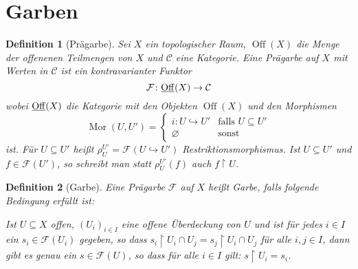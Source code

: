 \documentclass[a4paper,oneside]{scrbook}
\theoremstyle{break}
\newtheorem{Def}{Definition}[section]
\theoremstyle{nonumberbreak}
\theoremstyle{nonumberplain}
\theoremstyle{break}
\newcommand{\Mor}{%
	\ensuremath{\operatorname{Mor}}%
}
\newcommand{\Off}{%
	\ensuremath{\operatorname{Off}}%
}
\newcommand{\Cat}[1]{%
	\ensuremath{\underline{#1}}%
}
\newcommand{\mono}{%
	\ensuremath{\hookrightarrow}%
}
\renewcommand{\emptyset}{%
	\ensuremath{\varnothing}%
}
\begin{document}
\section{Garben}

\begin{Def}[Prägarbe]
	\label{def:presheaf}
	Sei $X$ ein topologischer Raum, $\Off(X)$ die Menge der offenenen Teilmengen von $X$ und $\mathcal{C}$ eine Kategorie.
	Eine \emph{Prägarbe} auf $X$ mit Werten in $\mathcal{C}$ ist ein kontravarianter Funktor
	\[ \mathcal{F}\colon \Cat{\Off}(X) \to \mathcal{C} \]
	wobei $\Cat{\Off}(X)$ die Kategorie mit den Objekten $\Off(X)$ und den Morphismen 
	\[
	 \Mor(U,U') = \begin{cases}  i\colon U \mono U' & \text{falls } U \subseteq U'\\%
	\emptyset & \text{sonst}%
	\end{cases}
	\]
	ist.
	Für $U \subseteq U'$ heißt $\rho_{U}^{U'} = \mathcal{F}( U \mono U' )$ \emph{Restriktionsmorphismus}.
	Ist $U \subseteq U'$ und $f \in \mathcal{F}(U')$, so schreibt man statt $\rho_{U}^{U'}(f)$ auch $f\restriction U$.
\end{Def}



\begin{Def}[Garbe]
	\label{def:sheaf}
	Eine Prägarbe $\mathcal{F}$ auf $X$ heißt \emph{Garbe}, falls folgende Bedingung erfüllt ist:

	Ist $U \subseteq X$ offen, $(U_i)_{i\in I}$ eine offene Überdeckung von $U$ und ist für jedes $i\in I$ ein $s_i \in \mathcal{F}(U_i)$ gegeben, so dass $s_i\restriction U_i \cap U_j = s_j \restriction U_i \cap U_j$ für alle $i,j \in I$, dann gibt es genau ein $s \in \mathcal{F}(U)$, so dass für alle $i\in I$ gilt: $s\restriction U_i = s_i$.
\end{Def}
\end{document}
